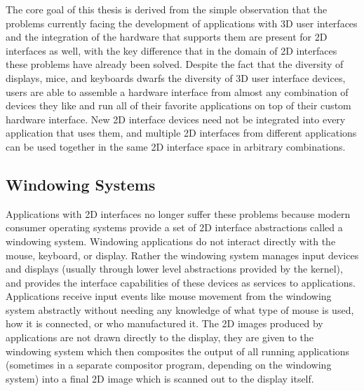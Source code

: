 	The core goal of this thesis is derived from the simple observation that the problems currently facing the development of applications with 3D user interfaces and the integration of the hardware that supports them are present for 2D interfaces as well, with the key difference that in the domain of 2D interfaces these problems have already been solved. Despite the fact that the diversity of displays, mice, and keyboards dwarfs the diversity of 3D user interface devices, users are able to assemble a hardware interface from almost any combination of devices they like and run all of their favorite applications on top of their custom hardware interface. New 2D interface devices need not be integrated into every application that uses them, and multiple 2D interfaces from different applications can be used together in the same 2D interface space in arbitrary combinations. 
	
\subsection{Windowing Systems}

	Applications with 2D interfaces no longer suffer these problems because modern consumer operating systems provide a set of 2D interface abstractions called a windowing system. Windowing applications do not interact directly with the mouse, keyboard, or display. Rather the windowing system manages input devices and displays (usually through lower level abstractions provided by the kernel), and provides the interface capabilities of these devices as services to applications. Applications receive input events like mouse movement from the windowing system abstractly without needing any knowledge of what type of mouse is used, how it is connected, or who manufactured it. The 2D images produced by applications are not drawn directly to the display, they are given to the windowing system which then composites the output of all running applications (sometimes in a separate compositor program, depending on the windowing system) into a final 2D image which is scanned out to the display itself. 
	
